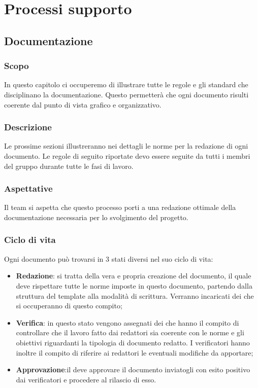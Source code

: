 \section{Processi supporto}
\subsection{Documentazione} \label{_processoDiDocumentazione}

\subsubsection{Scopo}
In questo capitolo ci occuperemo di illustrare tutte le regole e gli standard che disciplinano la documentazione. Questo permetterà che ogni documento risulti coerente dal punto di vista grafico e organizzativo.
\subsubsection{Descrizione}
Le prossime sezioni illustreranno nei dettagli le norme per la redazione di ogni documento.
Le regole di seguito riportate devo essere seguite da tutti i membri del gruppo durante tutte le fasi di lavoro.

\subsubsection{Aspettative}
Il team si aspetta che questo processo porti a una redazione ottimale della documentazione necessaria per lo svolgimento del progetto.

\subsubsection{Ciclo di vita}
Ogni documento può trovarsi in 3 stati diversi nel suo ciclo di vita:
\begin{itemize}
    \item\textbf{Redazione}: si tratta della vera e propria creazione del documento, il quale deve rispettare tutte le norme imposte in questo documento, partendo dalla struttura del template alla modalità di scrittura. Verranno incaricati dei  che si occuperanno di questo compito;
    \item\textbf{Verifica}: in questo stato vengono assegnati dei  che hanno il compito di controllare che il lavoro fatto dai redattori sia coerente con le norme e gli obiettivi riguardanti la tipologia di documento redatto. I verificatori hanno inoltre il compito di riferire ai redattori le eventuali modifiche da apportare;
    \item\textbf{Approvazione}:il  deve approvare il documento inviatogli con esito positivo dai verificatori e procedere al rilascio di esso.
\end{itemize}


